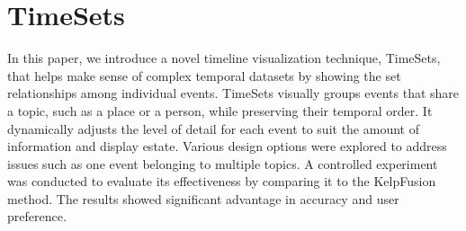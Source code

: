 \chapter{TimeSets}

\graphicspath{{Chapter4/figures/}}

In this paper, we introduce a novel timeline visualization technique, TimeSets, that helps make sense of complex temporal datasets by showing the set relationships among individual events. TimeSets visually groups events that share a topic, such as a place or a person, while preserving their temporal order. It dynamically adjusts the level of detail for each event to suit the amount of information and display estate. Various design options were explored to address issues such as one event belonging to multiple topics. A controlled experiment was conducted to evaluate its effectiveness by comparing it to the KelpFusion method. The results showed significant advantage in accuracy and user preference.


%




